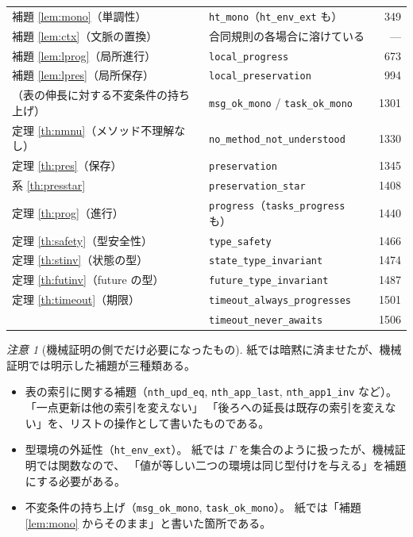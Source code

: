 \documentclass[11pt,a4paper]{ltjsarticle}
\theoremstyle{definition}
\theoremstyle{remark}
\newtheorem{remark}[theorem]{注意}
\begin{document}
\begin{longtable}{p{}p{}r}
補題 \ref{lem:mono}（単調性） & \texttt{ht\_mono}（\texttt{ht\_env\_ext} も） & 349 \\
補題 \ref{lem:ctx}（文脈の置換） & 合同規則の各場合に溶けている & --- \\
補題 \ref{lem:lprog}（局所進行） & \texttt{local\_progress} & 673 \\
補題 \ref{lem:lpres}（局所保存） & \texttt{local\_preservation} & 994 \\
（表の伸長に対する不変条件の持ち上げ） & \texttt{msg\_ok\_mono} / \texttt{task\_ok\_mono} & 1301 \\
\midrule
定理 \ref{th:nmnu}（メソッド不理解なし） & \texttt{no\_method\_not\_understood} & 1330 \\
定理 \ref{th:pres}（保存） & \texttt{preservation} & 1345 \\
系 \ref{th:presstar} & \texttt{preservation\_star} & 1408 \\
定理 \ref{th:prog}（進行） & \texttt{progress}（\texttt{tasks\_progress} も） & 1440 \\
定理 \ref{th:safety}（型安全性） & \texttt{type\_safety} & 1466 \\
定理 \ref{th:stinv}（状態の型） & \texttt{state\_type\_invariant} & 1474 \\
定理 \ref{th:futinv}（future の型） & \texttt{future\_type\_invariant} & 1487 \\
定理 \ref{th:timeout}（期限） & \texttt{timeout\_always\_progresses} & 1501 \\
 & \texttt{timeout\_never\_awaits} & 1506 \\
\bottomrule
\end{longtable}

\begin{remark}[機械証明の側でだけ必要になったもの]
紙では暗黙に済ませたが、機械証明では明示した補題が三種類ある。
\begin{itemize}\itemsep1pt
\item 表の索引に関する補題（\texttt{nth\_upd\_eq}, \texttt{nth\_app\_last},
  \texttt{nth\_app1\_inv} など）。「一点更新は他の索引を変えない」
  「後ろへの延長は既存の索引を変えない」を、リストの操作として書いたものである。
\item 型環境の外延性（\texttt{ht\_env\_ext}）。
  紙では $\Gamma$ を集合のように扱ったが、機械証明では関数なので、
  「値が等しい二つの環境は同じ型付けを与える」を補題にする必要がある。
\item 不変条件の持ち上げ（\texttt{msg\_ok\_mono}, \texttt{task\_ok\_mono}）。
  紙では「補題 \ref{lem:mono} からそのまま」と書いた箇所である。
\end{itemize}
\end{remark}
\end{document}
